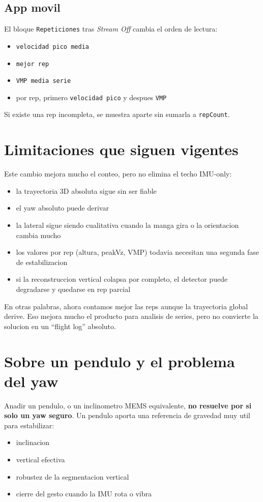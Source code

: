 ﻿\documentclass[11pt,a4paper]{article}
\begin{document}
\subsection*{App movil}
El bloque \texttt{Repeticiones} tras \emph{Stream Off} cambia el orden de lectura:
\begin{itemize}[leftmargin=14pt]
  \item \texttt{velocidad pico media}
  \item \texttt{mejor rep}
  \item \texttt{VMP media serie}
  \item por rep, primero \texttt{velocidad pico} y despues \texttt{VMP}
\end{itemize}

Si existe una rep incompleta, se muestra aparte sin sumarla a \texttt{repCount}.

\section{Limitaciones que siguen vigentes}
Este cambio mejora mucho el conteo, pero no elimina el techo IMU-only:
\begin{itemize}[leftmargin=14pt]
  \item la trayectoria 3D absoluta sigue sin ser fiable
  \item el yaw absoluto puede derivar
  \item la lateral sigue siendo cualitativa cuando la manga gira o la orientacion cambia mucho
  \item los valores por rep (altura, peakVz, VMP) todavia necesitan una segunda fase de estabilizacion
  \item si la reconstruccion vertical colapsa por completo, el detector puede degradarse y quedarse en rep parcial
\end{itemize}

En otras palabras, ahora contamos mejor las reps aunque la trayectoria global derive. Eso mejora mucho el producto para analisis de series, pero no convierte la solucion en un ``flight log'' absoluto.

\section{Sobre un pendulo y el problema del yaw}
Anadir un pendulo, o un inclinometro MEMS equivalente, \textbf{no resuelve por si solo un yaw seguro}. Un pendulo aporta una referencia de gravedad muy util para estabilizar:
\begin{itemize}[leftmargin=14pt]
  \item inclinacion
  \item vertical efectiva
  \item robustez de la segmentacion vertical
  \item cierre del gesto cuando la IMU rota o vibra
\end{itemize}
\end{document}
